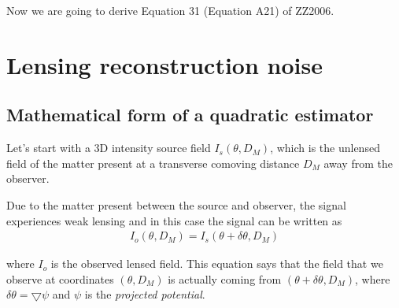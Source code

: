 \documentclass[12pt]{article}
\newcommand{\beqa}{\begin{eqnarray}}
\newcommand{\eeqa}{\end{eqnarray}}
\numberwithin{equation}{section}
\begin{document}
Now we are going to derive Equation 31 (Equation A21) of ZZ2006.

\section{Lensing reconstruction noise}
\subsection{Mathematical form of a quadratic estimator}
Let's start with a 3D intensity source field $I_s(\theta, D_M)$, which is the unlensed field of the matter present at a transverse comoving distance $D_M$ away from the observer. 

Due to the matter present between the source and observer, the signal experiences weak lensing and in this case the signal can be written as
\beqa
I_o(\theta,D_M) = I_s(\theta + \delta\theta, D_M )
\eeqa

where $I_o$ is the observed lensed field. This equation says that the field that we observe at coordinates $(\theta,D_M)$ is actually coming from $(\theta + \delta\theta, D_M)$, where $\delta\theta = \bigtriangledown\psi$ and $\psi$ is the \textit{projected potential}. 
\end{document}
